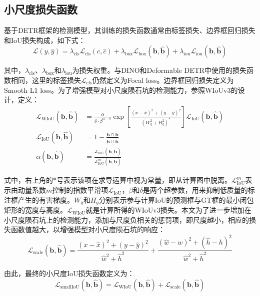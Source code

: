 \subsection{小尺度损失函数}
基于DETR框架的检测模型，其训练的损失函数通常由标签损失、边界框回归损失和IoU损失构成，如下式：
\begin{equation}
    \mathcal{L}(y,\hat{y}) = \lambda_{\text{cls}}\mathcal{L}_{\text{cls}}(c,\hat{c}) +  \lambda_{\text{box}}\mathcal{L}_{\text{box}}(\mathbf{b},\mathbf{\hat{b}}) +  \lambda_{\text{iou}}\mathcal{L}_{\text{iou}}(\mathbf{b},\mathbf{\hat{b}})
  \label{eq:detr-loss}
\end{equation}\par
其中，$\lambda_{\text{cls}}$、$\lambda_{\text{box}}$和$\lambda_{\text{iou}}$为损失权重。与DINO\cite{zhangDINODETRImproved2023}和Deformable DETR\cite{zhuDeformableDETRDeformable2021}中使用的损失函数相同，这里的标签损失$\mathcal{L}_\text{cls}$仍然定义为Focal loss\cite{linFocalLossDense2017}。边界框回归损失定义为Smooth L1 loss。为了增强模型对小尺度陨石坑的检测能力，参照WIoUv3\cite{tongWiseIoUBoundingBox2023}的设计，定义：
\begin{align}
  \mathcal{L}_\text{WIoU}(\mathbf{b},\mathbf{\hat{b}}) &=\frac{\alpha}{\delta\cdot\beta^{\alpha-\delta}}\exp\left[\frac{(x-\hat{x})^2+(y-\hat{y})^2}{(W_g^2+H_g^2)^*}\right]\mathcal{L}_\text{IoU}(\mathbf{b},\mathbf{\hat{b}})\\
  \mathcal{L}_\text{IoU}(\mathbf{b},\mathbf{\hat{b}}) &=1-\frac{\mathbf{b}\cap\mathbf{\hat{b}}}{\mathbf{b}\cup\mathbf{\hat{b}}}\\
  \alpha(\mathbf{b},\mathbf{\hat{b}})&= \frac{\mathcal{L}_\text{IoU}(\mathbf{b},\mathbf{\hat{b}})}{\mathcal{L}^m_\text{IoU}(\mathbf{b},\mathbf{\hat{b}})}
\end{align}\par
式中，右上角的$*$号表示该项在求导运算中视为常量，即从计算图中脱离。$\mathcal{L}^m_\text{IoU}$表示由动量系数$m$控制的指数平滑项$\mathcal{L}_\text{IoU}$，$\beta$和$\delta$是两个超参数，用来抑制低质量的标注框产生的有害梯度。$W_g$和$H_g$分别表示参与计算IoU的预测框与GT框的最小闭包矩形的宽度与高度。$\mathcal{L}_\text{WIoU}$就是计算所得的WIoUv3损失。本文为了进一步增加在小尺度陨石坑上的检测能力，添加与尺度负相关的惩罚项，即尺度越小，相应的损失函数值越大，以增强模型对小尺度陨石坑的响应：
\begin{equation}
  \mathcal{L}_\text{scale}(\mathbf{b},\mathbf{\hat{b}}) = \frac{(x-\hat{x})^2+(y-\hat{y})^2}{\hat{w}^2+\hat{h}^2}+\frac{(\hat{w}-w)^2+(\hat{h}-h)^2}{\hat{w}^2+\hat{h}^2}
\end{equation}\par
由此，最终的小尺度IoU损失函数定义为：
\begin{equation}
  \mathcal{L}_\text{smallIoU}(\mathbf{b},\mathbf{\hat{b}}) = \mathcal{L}_\text{WIoU}(\mathbf{b},\mathbf{\hat{b}})+\mathcal{L}_\text{scale}(\mathbf{b},\mathbf{\hat{b}})
\end{equation}

